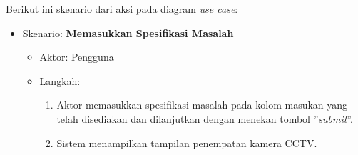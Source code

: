 Berikut ini skenario dari aksi pada diagram \textit{use case}:
\begin{itemize}
	\item Skenario: \textbf{Memasukkan Spesifikasi Masalah}
	\begin{itemize}
		\item Aktor: Pengguna
		\item Langkah:
		\begin{enumerate}
			\item Aktor memasukkan spesifikasi masalah pada kolom masukan yang telah disediakan dan dilanjutkan dengan menekan tombol ''\textit{submit}''.
			\item Sistem menampilkan tampilan penempatan kamera CCTV.
		\end{enumerate}
	\end{itemize}

\end{itemize}
